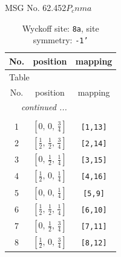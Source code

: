 \documentclass[fleqn,8pt]{jsarticle}
\begin{document}
\setcounter{MaxMatrixCols}{32}

\renewcommand{\tablename}{Table~}
\renewcommand{\figurename}{Figure~}
\begin{center}
\LARGE
MSG No. 62.452\quad$P_{c}nma$
\end{center}
\renewcommand{\arraystretch}{1.2}
\begin{longtable}{ccc}
\caption{Wyckoff site: {\tt 8a}, site symmetry: {\tt -1'}}
 \\
 \hline \hline
No. & position & mapping \\ \hline \endfirsthead

\multicolumn{2}{l}{\tablename\ \thetable{}} \\
 \hline \hline
No. & position & mapping \\ \hline \endhead

 \hline \hline
\multicolumn{2}{r}{\footnotesize\it continued ...} \\ \endfoot

 \hline \hline
\multicolumn{2}{r}{} \\ \endlastfoot

1 & $\left[ 0,\, 0,\, \frac{3}{4} \right]$ & {\tt [1,13]} \\ \hline
2 & $\left[ \frac{1}{2},\, \frac{1}{2},\, \frac{3}{4} \right]$ & {\tt [2,14]} \\ \hline
3 & $\left[ 0,\, \frac{1}{2},\, \frac{1}{4} \right]$ & {\tt [3,15]} \\ \hline
4 & $\left[ \frac{1}{2},\, 0,\, \frac{1}{4} \right]$ & {\tt [4,16]} \\ \hline
5 & $\left[ 0,\, 0,\, \frac{1}{4} \right]$ & {\tt [5,9]} \\ \hline
6 & $\left[ \frac{1}{2},\, \frac{1}{2},\, \frac{1}{4} \right]$ & {\tt [6,10]} \\ \hline
7 & $\left[ 0,\, \frac{1}{2},\, \frac{3}{4} \right]$ & {\tt [7,11]} \\ \hline
8 & $\left[ \frac{1}{2},\, 0,\, \frac{3}{4} \right]$ & {\tt [8,12]} \\
\end{longtable}
\renewcommand{\arraystretch}{1.2}
\end{document}

